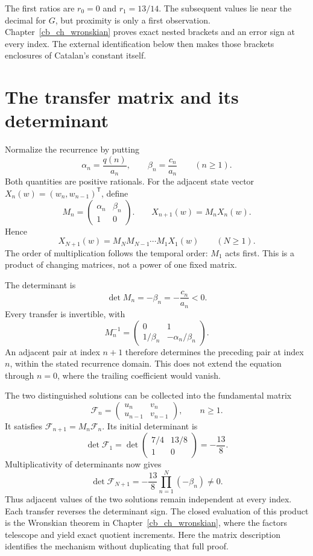 The first ratios are $r_0=0$ and $r_1=13/14$. The subsequent values lie
near the decimal for $G$, but proximity is only a first observation.
Chapter~\ref{cb_ch_wronskian} proves exact nested brackets and an error
sign at every index. The external identification below then makes those
brackets enclosures of Catalan's constant itself.

\section{The transfer matrix and its determinant}

Normalize the recurrence by putting
\[
 \alpha_n=\frac{q(n)}{a_n},\qquad
 \beta_n=\frac{c_n}{a_n}\qquad(n\geq1).
\]
Both quantities are positive rationals. For the adjacent state vector
$X_n(w)=(w_n,w_{n-1})^{\mathsf T}$, define
\begin{equation}\label{cb_eq_transfer}
 M_n=\begin{pmatrix}\alpha_n&\beta_n\\1&0\end{pmatrix}.
 \qquad X_{n+1}(w)=M_nX_n(w).
\end{equation}
Hence
\[
 X_{N+1}(w)=M_NM_{N-1}\cdots M_1X_1(w)\qquad(N\geq1).
\]
The order of multiplication follows the temporal order: $M_1$ acts first.
This is a product of changing matrices, not a power of one fixed matrix.

The determinant is
\[
 \det M_n=-\beta_n=-\frac{c_n}{a_n}<0.
\]
Every transfer is invertible, with
\[
 M_n^{-1}=\begin{pmatrix}0&1\\1/\beta_n&-\alpha_n/\beta_n\end{pmatrix}.
\]
An adjacent pair at index $n+1$ therefore determines the preceding pair at
index $n$, within the stated recurrence domain. This does not extend the
equation through $n=0$, where the trailing coefficient would vanish.

The two distinguished solutions can be collected into the fundamental
matrix
\[
 \mathcal F_n=
 \begin{pmatrix}u_n&v_n\\u_{n-1}&v_{n-1}\end{pmatrix},\qquad n\geq1.
\]
It satisfies $\mathcal F_{n+1}=M_n\mathcal F_n$. Its initial determinant is
\[
 \det\mathcal F_1=
 \det\begin{pmatrix}7/4&13/8\\1&0\end{pmatrix}=-\frac{13}{8}.
\]
Multiplicativity of determinants now gives
\[
 \det\mathcal F_{N+1}
 =-\frac{13}{8}\prod_{n=1}^N(-\beta_n)\ne0.
\]
Thus adjacent values of the two solutions remain independent at every
index. Each transfer reverses the determinant sign. The closed evaluation
of this product is the Wronskian theorem in
Chapter~\ref{cb_ch_wronskian}, where the factors telescope and yield exact
quotient increments. Here the matrix description identifies the mechanism
without duplicating that full proof.

